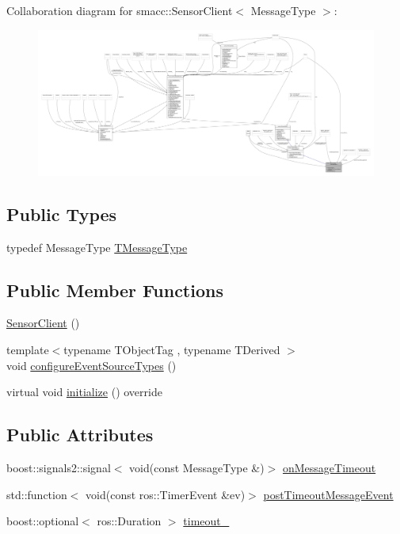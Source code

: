 Collaboration diagram for smacc\+:\+:Sensor\+Client$<$ Message\+Type $>$\+:
\nopagebreak
\begin{figure}[H]
\begin{center}
\leavevmode
\includegraphics[width=350pt]{classsmacc_1_1SensorClient__coll__graph}
\end{center}
\end{figure}
\subsection*{Public Types}
\begin{DoxyCompactItemize}
\item 
typedef Message\+Type \hyperlink{classsmacc_1_1SensorClient_a5a35234e021e849d213a3dae58094ac5}{T\+Message\+Type}
\end{DoxyCompactItemize}
\subsection*{Public Member Functions}
\begin{DoxyCompactItemize}
\item 
\hyperlink{classsmacc_1_1SensorClient_a3d33430d7b925d88d816d384d3c533c1}{Sensor\+Client} ()
\item 
{\footnotesize template$<$typename T\+Object\+Tag , typename T\+Derived $>$ }\\void \hyperlink{classsmacc_1_1SensorClient_ae1384ddfe1fab2c119be52b587dd6071}{configure\+Event\+Source\+Types} ()
\item 
virtual void \hyperlink{classsmacc_1_1SensorClient_aab9ae52c239305f09cfc4aa48e533ef8}{initialize} () override
\end{DoxyCompactItemize}
\subsection*{Public Attributes}
\begin{DoxyCompactItemize}
\item 
boost\+::signals2\+::signal$<$ void(const Message\+Type \&)$>$ \hyperlink{classsmacc_1_1SensorClient_a3652c00d16a1a82ef6b43466ef360c72}{on\+Message\+Timeout}
\item 
std\+::function$<$ void(const ros\+::\+Timer\+Event \&ev)$>$ \hyperlink{classsmacc_1_1SensorClient_ad2c6d9f2e7ceddac26024cd5901a6739}{post\+Timeout\+Message\+Event}
\item 
boost\+::optional$<$ ros\+::\+Duration $>$ \hyperlink{classsmacc_1_1SensorClient_a660452b6940625d3c60581961124ebd8}{timeout\+\_\+}
\end{DoxyCompactItemize}
